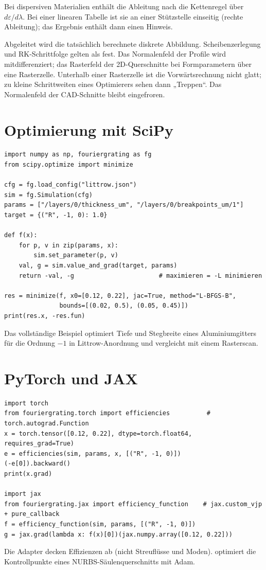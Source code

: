 Bei dispersiven Materialien enthält die Ableitung nach  die Kettenregel über
$d\varepsilon/d\lambda$. Bei einer linearen Tabelle ist sie an einer Stützstelle einseitig (rechte Ableitung); das
Ergebnis enthält dann einen Hinweis.

\begin{hinweis}
Abgeleitet wird die tatsächlich berechnete diskrete Abbildung. Scheibenzerlegung und RK-Schrittfolge gelten als
fest. Das Normalenfeld der Profile wird mitdifferenziert; das Rasterfeld der 2D-Querschnitte bei Formparametern über
eine Rasterzelle. Unterhalb einer Rasterzelle ist die Vorwärtsrechnung nicht glatt; zu kleine Schrittweiten eines
Optimierers sehen dann „Treppen“. Das Normalenfeld der CAD-Schnitte bleibt eingefroren.
\end{hinweis}

\section{Optimierung mit SciPy}
%
\begin{lstlisting}[style=py]
import numpy as np, fouriergrating as fg
from scipy.optimize import minimize

cfg = fg.load_config("littrow.json")
sim = fg.Simulation(cfg)
params = ["/layers/0/thickness_um", "/layers/0/breakpoints_um/1"]
target = {("R", -1, 0): 1.0}

def f(x):
    for p, v in zip(params, x):
        sim.set_parameter(p, v)
    val, g = sim.value_and_grad(target, params)
    return -val, -g                       # maximieren = -L minimieren

res = minimize(f, x0=[0.12, 0.22], jac=True, method="L-BFGS-B",
               bounds=[(0.02, 0.5), (0.05, 0.45)])
print(res.x, -res.fun)
\end{lstlisting}
Das vollständige Beispiel  optimiert Tiefe und Stegbreite eines
Aluminiumgitters für die Ordnung $-1$ in Littrow-Anordnung und vergleicht mit einem Rasterscan.

\section{PyTorch und JAX}
%
\begin{lstlisting}[style=py]
import torch
from fouriergrating.torch import efficiencies          # torch.autograd.Function
x = torch.tensor([0.12, 0.22], dtype=torch.float64, requires_grad=True)
e = efficiencies(sim, params, x, [("R", -1, 0)])
(-e[0]).backward()
print(x.grad)

import jax
from fouriergrating.jax import efficiency_function    # jax.custom_vjp + pure_callback
f = efficiency_function(sim, params, [("R", -1, 0)])
g = jax.grad(lambda x: f(x)[0])(jax.numpy.array([0.12, 0.22]))
\end{lstlisting}
Die Adapter decken Effizienzen ab (nicht Streuflüsse und Moden). 
optimiert die Kontrollpunkte eines NURBS-Säulenquerschnitts mit Adam.

